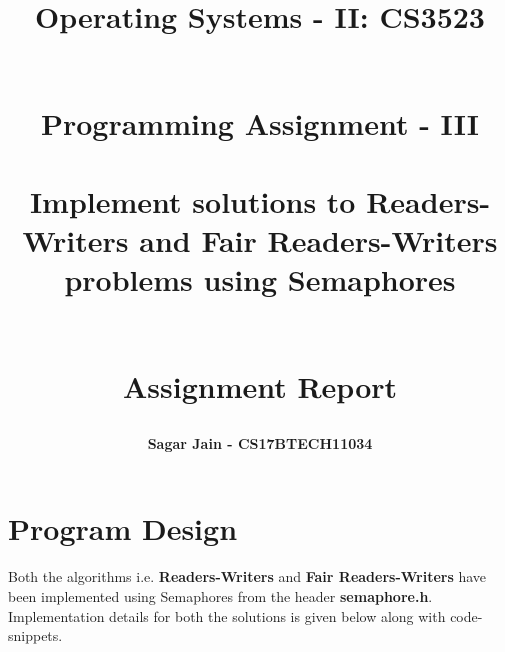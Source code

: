 \documentclass[a4paper,12pt]{report}
\begin{document}
\title{
\textbf{Operating Systems - II: CS3523}\\~\\
\begin{large}
\textbf{Programming Assignment - III\\~\\Implement solutions to Readers-Writers and Fair
Readers-Writers problems using Semaphores\\~\\}
\end{large}
\begin{large}
\textbf{Assignment Report}
\end{large}
}
\author{\textbf{Sagar Jain - CS17BTECH11034}\\}
\maketitle
\begin{large}
\tableofcontents
\end{large}
\newpage
\section{Program Design}
Both the algorithms i.e. \textbf{Readers-Writers} and \textbf{Fair Readers-Writers} have been implemented using Semaphores from the header \textbf{semaphore.h}. Implementation details for both the solutions is given below along with code-snippets.
\end{document}
